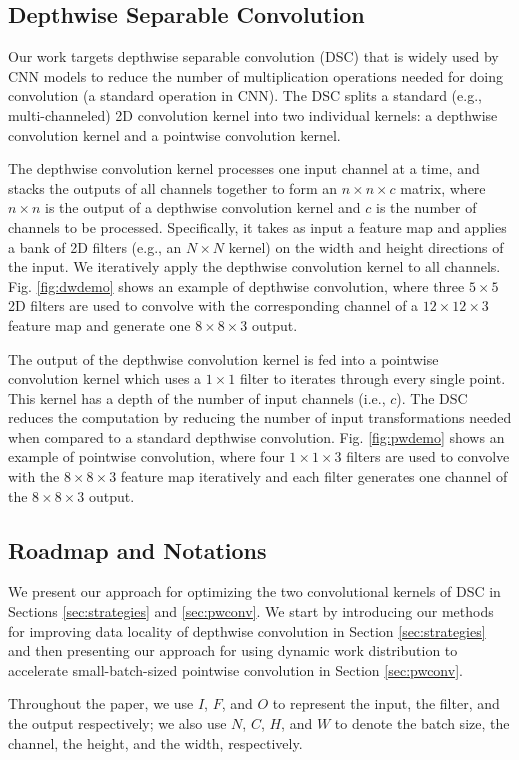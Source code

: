 \subsection{Depthwise Separable Convolution}
Our work targets depthwise separable convolution (DSC) that is widely used by  CNN  models to reduce the number of multiplication
operations needed for doing convolution (a standard operation in CNN). The DSC splits a standard (e.g., multi-channeled) 2D
convolution kernel into two individual kernels: a depthwise convolution kernel and a pointwise convolution kernel. 

The depthwise
convolution kernel processes one input channel at a time, and stacks the outputs of all channels together to form an $n \times n \times c$
matrix, where $n \times n$ is the output of a depthwise convolution kernel and $c$ is the number of channels to be processed. Specifically,
it takes as input a feature map and applies a bank of 2D filters (e.g., an $N \times N$ kernel) on the width and height directions of
the input. We iteratively apply the depthwise convolution kernel to all channels. Fig. \ref{fig:dwdemo} shows an example of depthwise convolution, where three $5 \times 5$ 2D filters are used to convolve with the corresponding channel of a $12 \times 12 \times 3$ feature map and generate one $8 \times 8 \times 3$ output. 

The output of the depthwise convolution kernel is fed
into a pointwise convolution kernel which uses a $1 \times 1$ filter to iterates through every single point. This kernel has a depth of the
number of input channels (i.e., $c$). The DSC reduces the computation by reducing the number of input transformations needed when compared
to a standard depthwise convolution. Fig. \ref{fig:pwdemo} shows an example of pointwise convolution, where four $1 \times 1 \times 3$ filters are used to convolve with the $8 \times 8 \times 3$ feature map iteratively and each filter generates one channel of the $8 \times 8 \times 3$ output.


\subsection{Roadmap and Notations\label{sec:roadmap}} We present our approach for optimizing the two convolutional kernels of DSC in
Sections \ref {sec:strategies} and \ref {sec:pwconv}. We start by introducing our methods for improving data locality of depthwise
convolution in Section \ref{sec:strategies} and then presenting our approach for using dynamic work distribution to accelerate
small-batch-sized pointwise convolution in Section \ref {sec:pwconv}.

 Throughout the paper, we use $I$, $F$, and $O$ to represent the input, the filter, and the output respectively; we also
use $N$, $C$, $H$, and $W$ to denote the batch size, the channel, the height, and the width, respectively.
